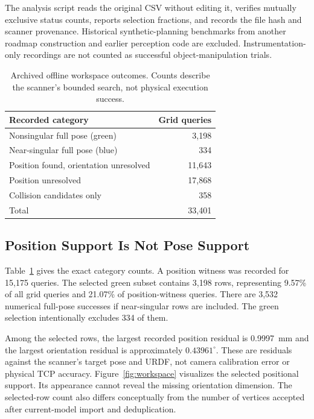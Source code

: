 \documentclass[letterpaper,10pt,conference]{ieeeconf}
\begin{document}
The analysis script reads the original CSV without editing it, verifies mutually exclusive status counts, reports selection fractions, and records the file hash and scanner provenance. Historical synthetic-planning benchmarks from another roadmap construction and earlier perception code are excluded. Instrumentation-only recordings are not counted as successful object-manipulation trials.

\begin{table}[t]
\centering\caption{Archived offline workspace outcomes. Counts describe the scanner's bounded search, not physical execution success.}
\label{tab:workspace}
\small\begin{tabular}{@{}lr@{}}\toprule
Recorded category & Grid queries \\\midrule
Nonsingular full pose (green) & 3,198 \\
Near-singular full pose (blue) & 334 \\
Position found, orientation unresolved & 11,643 \\
Position unresolved & 17,868 \\
Collision candidates only & 358 \\\midrule
Total & 33,401 \\\bottomrule
\end{tabular}
\end{table}

\subsection{Position Support Is Not Pose Support}
Table~\ref{tab:workspace} gives the exact category counts. A position witness was recorded for 15,175 queries. The selected green subset contains 3,198 rows, representing 9.57\% of all grid queries and 21.07\% of position-witness queries. There are 3,532 numerical full-pose successes if near-singular rows are included. The green selection intentionally excludes 334 of them.

Among the selected rows, the largest recorded position residual is 0.9997~mm and the largest orientation residual is approximately $0.43961^\circ$. These are residuals against the scanner's target pose and URDF, not camera calibration error or physical TCP accuracy. Figure~\ref{fig:workspace} visualizes the selected positional support. Its appearance cannot reveal the missing orientation dimension. The selected-row count also differs conceptually from the number of vertices accepted after current-model import and deduplication.
\end{document}
